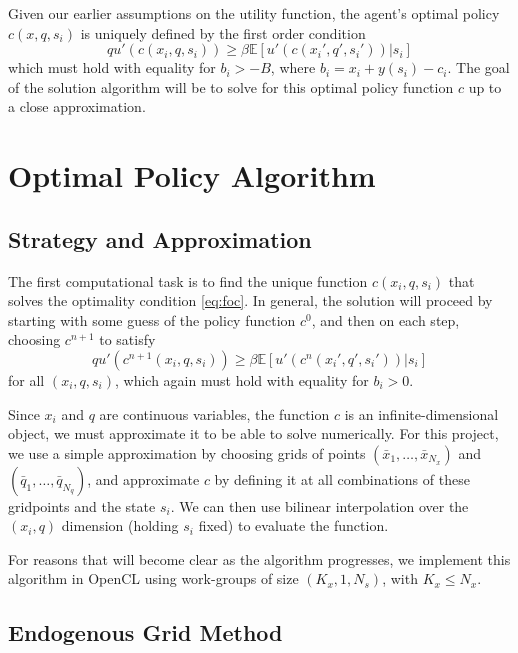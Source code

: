 \documentclass[a4paper,12pt]{article}
\newcommand{\E}{\mathbb{E}}
\numberwithin{equation}{section}
\theoremstyle{definition}
\begin{document}
Given our earlier assumptions on the utility function, the agent's
optimal policy $c(x, q, s_i)$ is uniquely defined by the first order
condition
\begin{equation}
  \label{eq:foc}
  q u'(c(x_i, q, s_i)) \ge \beta \E \left[ u'(c(x_i', q', s_i')) \Bigr| s_i \right]
\end{equation}
which must hold with equality for $b_i > -B$, where $b_i = x_i +
y(s_i) - c_i$. The goal of the solution algorithm will be to solve
for this optimal policy function $c$ up to a close approximation.

\section{Optimal Policy Algorithm}
\label{sec:optim-policy-algor}

\subsection{Strategy and Approximation}

The first computational task is to find the unique function $c(x_i, q,
s_i)$ that solves the optimality condition \eqref{eq:foc}. In general,
the solution will proceed by starting with some guess of the policy
function $c^0$, and then on each step, choosing $c^{n+1}$ to satisfy
\begin{equation}
  \label{eq:foc-iter}
  q u'(c^{n+1}(x_i, q, s_i)) \ge \beta \E \left[ u'(c^n(x_i', q', s_i')) \Bigr| s_i \right]
\end{equation}
for all $(x_i, q, s_i)$, which again must hold with equality for $b_i > 0$.

Since $x_i$ and $q$ are continuous variables, the function $c$ is an
infinite-dimensional object, we must approximate it to be able to
solve numerically. For this project, we use a simple approximation by
choosing grids of points $(\bar{x}_1, \ldots, \bar{x}_{N_x})$ and
$(\bar{q}_1, \ldots, \bar{q}_{N_q})$, and approximate $c$ by defining
it at all combinations of these gridpoints and the state $s_i$. We can
then use bilinear interpolation over the $(x_i, q)$ dimension (holding
$s_i$ fixed) to evaluate the function.

For reasons that will become clear as the algorithm progresses, we
implement this algorithm in OpenCL using work-groups of size $(K_x, 1,
N_s)$, with $K_x \le N_x$.

\subsection{Endogenous Grid Method}
\label{sec:endog-grid-meth}
\end{document}
